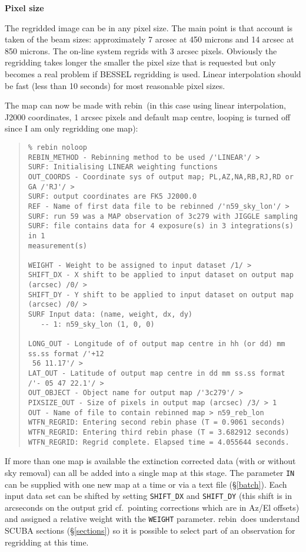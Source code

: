 \documentclass[twoside,11pt]{article}
\newcommand{\task}[1]{{\sf #1}}
\newcommand{\param}[1]{{\tt #1}}
\newcommand{\rebin}{\htmlref{\task{rebin}}{REBIN}}
\newenvironment{myquote}{\begin{quote}\begin{small}}{\end{small}\end{quote}}
\newcommand{\htmlref}[2]{#1}
\begin{document}
\begin{description}
\item {\bf Pixel size}

The regridded image can be in any pixel size. The main point is that account
is taken of the beam sizes: approximately 7 arcsec at 450 microns and 14
arcsec at 850 microns.  The on-line system regrids with 3 arcsec
pixels. Obviously the regridding takes longer the smaller the pixel size that
is requested but only becomes a real problem if BESSEL regridding is
used. Linear interpolation should be fast (less than 10 seconds) for most
reasonable pixel sizes.

\end{description}

The map can now be made with \rebin\ (in this case using linear interpolation,
J2000 coordinates, 1 arcsec pixels and default map centre, looping is turned
off since I am only regridding one map):
\begin{myquote}
\begin{verbatim}
% rebin noloop
REBIN_METHOD - Rebinning method to be used /'LINEAR'/ > 
SURF: Initialising LINEAR weighting functions
OUT_COORDS - Coordinate sys of output map; PL,AZ,NA,RB,RJ,RD or GA /'RJ'/ > 
SURF: output coordinates are FK5 J2000.0
REF - Name of first data file to be rebinned /'n59_sky_lon'/ > 
SURF: run 59 was a MAP observation of 3c279 with JIGGLE sampling
SURF: file contains data for 4 exposure(s) in 3 integrations(s) in 1
measurement(s)
 
WEIGHT - Weight to be assigned to input dataset /1/ > 
SHIFT_DX - X shift to be applied to input dataset on output map (arcsec) /0/ > 
SHIFT_DY - Y shift to be applied to input dataset on output map (arcsec) /0/ > 
SURF Input data: (name, weight, dx, dy)
   -- 1: n59_sky_lon (1, 0, 0)
 
LONG_OUT - Longitude of of output map centre in hh (or dd) mm ss.ss format /'+12
 56 11.17'/ > 
LAT_OUT - Latitude of output map centre in dd mm ss.ss format /'- 05 47 22.1'/ > 
OUT_OBJECT - Object name for output map /'3c279'/ > 
PIXSIZE_OUT - Size of pixels in output map (arcsec) /3/ > 1
OUT - Name of file to contain rebinned map > n59_reb_lon
WTFN_REGRID: Entering second rebin phase (T = 0.9061 seconds)
WTFN_REGRID: Entering third rebin phase (T = 3.682912 seconds)
WTFN_REGRID: Regrid complete. Elapsed time = 4.055644 seconds.
\end{verbatim}
\end{myquote}

If more than one map is available the extinction corrected data (with or
without sky removal) can all be added into a single map at this stage. The
parameter \param{IN} can be supplied with one new map at a time or via a text
file (\S\ref{batch}). Each input data set can be shifted by setting
\param{SHIFT\_DX} and \param{SHIFT\_DY} (this shift is in arcseconds on the
output grid cf.\ pointing corrections which are in Az/El offsets) and assigned
a relative weight with the \param{WEIGHT} parameter. \rebin\ does understand
SCUBA sections (\S\ref{sections}) so it is possible to select part of an
observation for regridding at this time.
\end{document}
